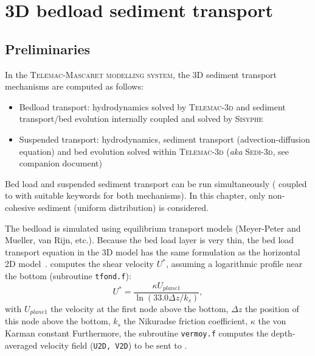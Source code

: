 \chapter[3D bedload sediment transport]{3D bedload sediment transport}\label{ch:3DBedloadTransport}

\section{Preliminaries}
In the \textsc{Telemac-Mascaret modelling system}, the 3D sediment transport mechanisms are computed as follows:

\begin{itemize}

\item Bedload transport: hydrodynamics solved by \textsc{Telemac-3d} and sediment transport/bed evolution internally coupled and solved by \textsc{Sisyphe} 

\item Suspended transport: hydrodynamics, sediment transport (advection-diffusion equation) and bed evolution solved within \textsc{Telemac-3d} (\textit{aka} \textsc{Sedi-3d}, see companion document) 

\end{itemize}

Bed load and suspended sediment transport can be run simultaneously ( coupled to \sisyphe{} with suitable keywords for both mechanisms). In this chapter, only non-cohesive sediment (uniform distribution) is considered.

The bedload is simulated using equilibrium transport models (Meyer-Peter and Mueller, van Rijn, etc.). Because the bed load layer is very thin, the bed load transport equation in the 3D model has the same formulation as the horizontal 2D model~\cite{wu2007computational}.  computes the shear velocity $U^*$, assuming a logarithmic profile near the bottom (subroutine \texttt{tfond.f}): 
\begin{equation*}
U^* = \frac{\kappa U_{plane 1}}{\ln \left(33.0 \Delta z / k_s\right)},
\end{equation*}
with $U_{plane 1}$ the velocity at the first node above the bottom, $\Delta z$ the position of this node above the bottom, $k_s$ the Nikuradse friction coefficient, $\kappa$ the von Karman constant %
Furthermore, the subroutine \texttt{vermoy.f} computes the depth-averaged velocity field (\texttt{U2D, V2D}) to be sent to \sisyphe{}.


